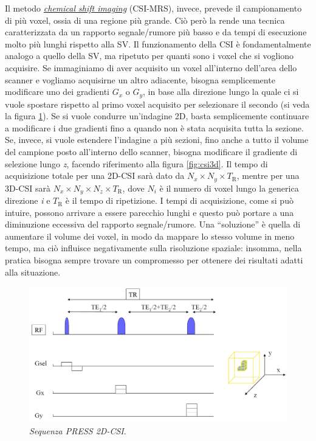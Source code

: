 \documentclass{report}
\newcommand{\virgolette}[1]{``#1''}
\newcommand{\figref}[1]{figura \ref{#1}}
\numberwithin{equation}{section}
\numberwithin{figure}{section}
\begin{document}
Il metodo \underline{\textit{chemical shift imaging}} (CSI-MRS), invece, prevede il campionamento di più voxel, ossia di una regione più grande. Ciò però la rende una tecnica caratterizzata da un rapporto segnale/rumore più basso e da tempi di esecuzione molto più lunghi rispetto alla SV. Il funzionamento della CSI è fondamentalmente analogo a quello della SV, ma ripetuto per quanti sono i voxel che si vogliono acquisire. Se immaginiamo di aver acquisito un voxel all'interno dell'area dello scanner e vogliamo acquisirne un altro adiacente, bisogna semplicemente modificare uno dei gradienti $G_x$ o $G_y$, in base alla direzione lungo la quale ci si vuole spostare rispetto al primo voxel acquisito per selezionare il secondo (si veda la \figref{fig:csi2d}). Se si vuole condurre un'indagine 2D, basta semplicemente continuare a modificare i due gradienti fino a quando non è stata acquisita tutta la sezione. Se, invece, si vuole estendere l'indagine a più sezioni, fino anche a tutto il volume del campione posto all'interno dello scanner, bisogna modificare il gradiente di selezione lungo \textit{z}, facendo riferimento alla \figref{fig:csi3d}. Il tempo di acquisizione totale per una 2D-CSI sarà dato da $N_x \times N_y \times T_\mathrm{R}$, mentre per una 3D-CSI sarà $N_x \times N_y \times N_z \times T_\mathrm{R}$, dove $N_i$ è il numero di voxel lungo la generica direzione \textit{i} e $T_\mathrm{R}$ è il tempo di ripetizione. I tempi di acquisizione, come si può intuire, possono arrivare a essere parecchio lunghi e questo può portare a una diminuzione eccessiva del rapporto segnale/rumore. Una \virgolette{soluzione} è quella di aumentare il volume dei voxel, in modo da mappare lo stesso volume in meno tempo, ma ciò influisce negativamente sulla risoluzione spaziale: insomma, nella pratica bisogna sempre trovare un compromesso per ottenere dei risultati adatti alla situazione.

\begin{figure}[htp]
\centering
\includegraphics[scale=0.57]{immagini/csi2d.png}
\caption{\label{fig:csi2d} \textit{Sequenza PRESS 2D-CSI}.}
\end{figure}
\end{document}
